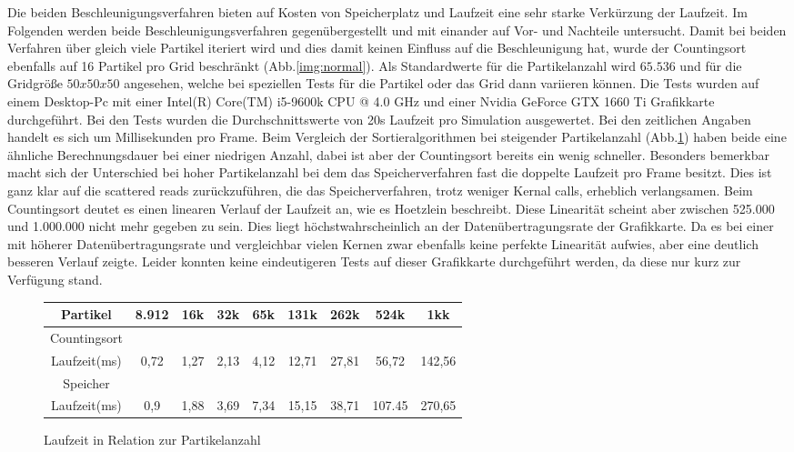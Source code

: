 \documentclass[intern,palatino]{cgBA}
\begin{document}
Die beiden Beschleunigungsverfahren bieten auf Kosten von Speicherplatz und Laufzeit eine sehr starke Verkürzung der Laufzeit. Im Folgenden werden beide Beschleunigungsverfahren gegenübergestellt und mit einander auf Vor- und Nachteile untersucht.
\newline
Damit bei beiden Verfahren über gleich viele Partikel iteriert wird und dies damit keinen Einfluss auf die Beschleunigung hat, wurde der Countingsort ebenfalls auf 16 Partikel pro Grid beschränkt (Abb.\ref{img:normal}). Als Standardwerte für die Partikelanzahl wird $65.536$ und für die Gridgröße $50x50x50$ angesehen, welche bei speziellen Tests für die Partikel oder das Grid dann variieren können.
\newline
Die Tests wurden auf einem Desktop-Pc mit einer Intel(R) Core(TM) i5-9600k CPU @ 4.0 GHz und einer Nvidia GeForce GTX 1660 Ti Grafikkarte durchgeführt. Bei den Tests wurden die Durchschnittswerte von 20s Laufzeit pro Simulation ausgewertet. Bei den zeitlichen Angaben handelt es sich um Millisekunden pro Frame.
\newline
Beim Vergleich der Sortieralgorithmen bei steigender Partikelanzahl (Abb.\ref{tab:particle}) haben beide eine ähnliche Berechnungsdauer bei einer niedrigen Anzahl, dabei ist aber der Countingsort bereits ein wenig schneller. Besonders bemerkbar macht sich der Unterschied bei hoher Partikelanzahl bei dem das Speicherverfahren fast die doppelte Laufzeit pro Frame besitzt. Dies ist ganz klar auf die scattered reads zurückzuführen, die das Speicherverfahren, trotz weniger Kernal calls, erheblich verlangsamen. Beim Countingsort deutet es einen linearen Verlauf der Laufzeit an, wie es Hoetzlein \cite{nvidia} beschreibt. Diese Linearität scheint aber zwischen 525.000 und 1.000.000 nicht mehr gegeben zu sein. Dies liegt höchstwahrscheinlich an der Datenübertragungsrate der Grafikkarte. Da es bei einer mit höherer Datenübertragungsrate und vergleichbar vielen Kernen zwar ebenfalls keine perfekte Linearität aufwies, aber eine deutlich besseren Verlauf zeigte. Leider konnten keine eindeutigeren Tests auf dieser Grafikkarte durchgeführt werden, da diese nur kurz zur Verfügung stand.  
\newline

\begin{figure}[H]
	\centering
	\begin{tabular}{ | c || c | c | c | c | c | c | c | c |}
		\hline
		Partikel			&  8.912 & 16k & 32k & 65k & 131k & 262k & 524k & 1kk	\\ \hline
		Countingsort														\\ \hline
		Laufzeit(ms)		&   0,72 &  1,27 &  2,13 &  4,12 &  12,71 &  27,81 &  56,72 &  142,56		 	\\ \hline
		
		Speicher															\\ \hline
		Laufzeit(ms)		&   0,9 &  1,88 &  3,69 &  7,34 &  15,15 &  38,71 &  107.45 &  270,65	\\
		\hline
	\end{tabular}
	\caption{Laufzeit in Relation zur Partikelanzahl}
	\label{tab:particle}
\end{figure}
\end{document}

